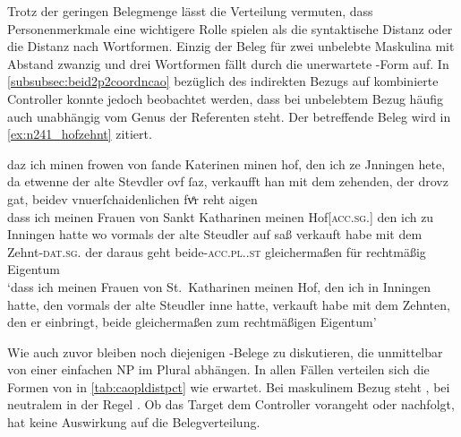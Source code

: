 Trotz der geringen Belegmenge lässt die Verteilung vermuten, dass
Personenmerkmale eine wichtigere Rolle spielen als die syntaktische Distanz
oder die Distanz nach Wortformen. Einzig der Beleg für zwei unbelebte Maskulina
mit Abstand zwanzig und drei Wortformen fällt durch die unerwartete
-Form auf. In \cref{subsubsec:beid2p2coordncao} bezüglich des
indirekten Bezugs auf kombinierte Controller konnte jedoch beobachtet werden,
dass bei unbelebtem Bezug häufig auch unab\-hängig vom Genus der Referenten
 steht. Der betreffende Beleg wird in \cref{ex:n241_hofzehnt}
zitiert.

\begin{exe}
\ex\label{ex:n241_hofzehnt}
	\setlength{\glossglue}{5pt plus 2pt minus 1pt}
	\gll daz ich minen frowen von ſande Katerinen minen hof, den ich ze
			Jnningen hete, da etwenne der alte Stevdler ovf ſaz, verkaufft han
			mit dem zehenden, der drovz gat, beidev vnuerſchaidenlichen fvͤr
			reht aigen \\
		dass ich meinen Frauen von Sankt Katharinen meinen
			Hof[\textsc{acc.sg.\MascI}] den ich zu Inningen hatte wo vormals
			der alte Steudler auf saß verkauft habe mit dem
			Zehnt-\textsc{dat.sg.\MascI} der daraus geht
			beide-\textsc{acc.pl.\NeutI.st} gleichermaßen für rechtmäßig
			Eigentum \\
	\trans `dass ich meinen Frauen von St.~Katharinen meinen Hof, den ich
		in Inningen hatte, den vormals der alte Steudler inne hatte, verkauft
		habe  mit dem Zehnten, den er einbringt, beide
		gleichermaßen zum rechtmäßigen Eigentum'
		\parencites(Nr.~N~241, Mainau und Konstanz, 1275)[195,37--38]{cao5}
\end{exe}

Wie auch zuvor bleiben noch diejenigen -Belege zu diskutieren,
die unmittelbar von einer einfachen NP im Plural abhängen. In allen Fällen
verteilen sich die Formen von  in
\cref{tab:caopldistpct} wie erwartet. Bei maskulinem Bezug steht ,
bei neutralem in der Regel . Ob das Target dem Controller
vorangeht oder nachfolgt, hat keine Auswirkung auf die Beleg\-verteilung.

